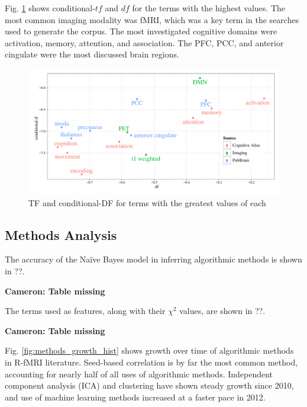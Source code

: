 \documentclass[5p]{elsarticle}
\newcommand\MyCBox[1]{%
  \colorbox{yellow!60}{\begin{varwidth}{\dimexpr\linewidth-2\fboxsep}#1\end{varwidth}}}
\newcommand{\COMMENTCC}[1]{\MyCBox{\textcolor{cc_commentcolor}{\textbf{Cameron:
#1}}}}
\begin{document}
Fig. \ref{fig:tfidf_top} shows conditional-$t\!f$ and $d\!f$ for the
terms with the highest values. The most common imaging modality was fMRI,
which was a key term in the searches used to generate the corpus. The most
investigated cognitive domains were activation, memory, attention, and
association. The PFC, PCC, and anterior cingulate were the most discussed
brain regions. 

\begin{figure}
  \begin{center}
    \includegraphics[width=\linewidth]{figures/tfidf_top}%
    \caption{TF and conditional-DF for terms with the greatest values of each
    \label{fig:tfidf_top}
    }
  \end{center}
\end{figure}

\subsection{Methods Analysis}

The accuracy of the Na\"ive Bayes model in inferring
algorithmic methods is shown in ??. \COMMENTCC{Table missing}

The terms used as features, along with their $\chi^2$ values, are shown in
??. \COMMENTCC{Table missing}

Fig. \ref{fig:methods_growth_hist} shows growth over time of algorithmic
methods in R-fMRI literature.  Seed-based correlation is by far the most
common method, accounting for nearly half of all uses of algorithmic
methods. Independent component analysis (ICA) and clustering have shown
steady growth since 2010, and use of machine learning methods increased at
a faster pace in 2012.
\end{document}
